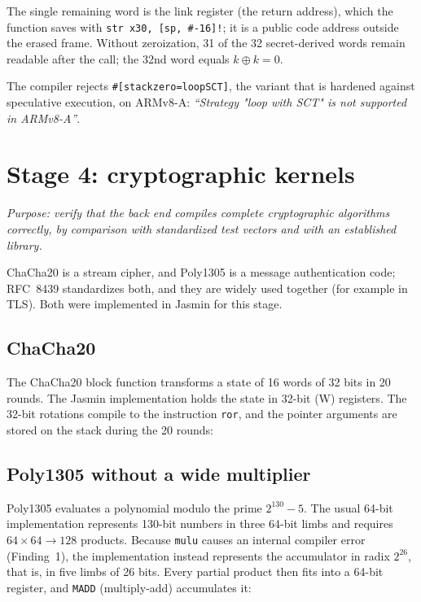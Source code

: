 \documentclass[11pt,a4paper]{article}
\newcommand{\file}[1]{\texttt{#1}}
\begin{document}
The single remaining word is the link register (the return address), which
the function saves with \texttt{str x30, [sp, \#-16]!}; it is a public code
address outside the erased frame. Without zeroization, 31 of the 32
secret-derived words remain readable after the call; the 32nd word equals
$k \oplus k = 0$.

\begin{note}
The compiler rejects \texttt{\#[stackzero=loopSCT]}, the variant that is
hardened against speculative execution, on ARMv8-A: \emph{``Strategy "loop
with SCT" is not supported in ARMv8-A''}.
\end{note}

\section{Stage 4: cryptographic kernels}

\emph{Purpose: verify that the back end compiles complete cryptographic
algorithms correctly, by comparison with standardized test vectors and with
an established library.}

ChaCha20 is a stream cipher, and Poly1305 is a message authentication code;
RFC~8439 standardizes both, and they are widely used together (for example
in TLS). Both were implemented in Jasmin for this stage.

\subsection{ChaCha20}

The ChaCha20 block function transforms a state of 16 words of 32 bits in 20
rounds. The Jasmin implementation holds the state in 32-bit (W) registers.
The 32-bit rotations compile to the instruction \texttt{ror}, and the
pointer arguments are stored on the stack during the 20 rounds:



\subsection{Poly1305 without a wide multiplier}

Poly1305 evaluates a polynomial modulo the prime $2^{130}-5$. The usual
64-bit implementation represents 130-bit numbers in three 64-bit limbs and
requires $64\times64\to128$ products. Because \texttt{mulu} causes an
internal compiler error (Finding~1), the implementation instead represents
the accumulator in radix $2^{26}$, that is, in five limbs of 26 bits. Every
partial product then fits into a 64-bit register, and \texttt{MADD}
(multiply-add) accumulates it:
\end{document}
